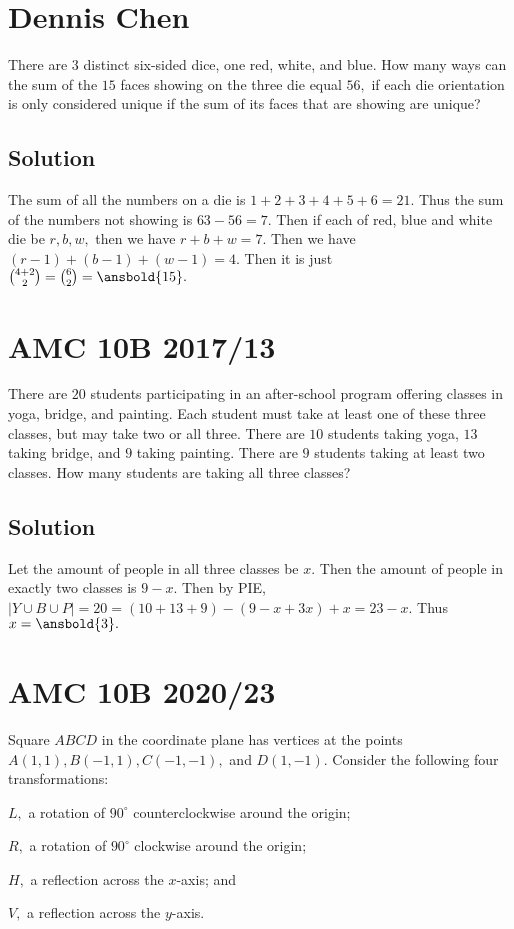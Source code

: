 \documentclass{article}
\begin{document}
\pagebreak\section{Dennis Chen}
There are $3$ distinct six-sided dice, one red, white, and blue. How many ways can the sum of the $15$ faces showing on the three die equal $56,$ if each die orientation is only considered unique if the sum of its faces that are showing are unique?

\subsection{Solution}
The sum of all the numbers on a die is $1+2+3+4+5+6=21.$ Thus the sum of the numbers not showing is $63-56=7.$ Then if each of red, blue and white die be $r, b, w,$ then we have $r+b+w=7.$ Then we have $(r-1)+(b-1)+(w-1)=4$. Then it is just $\binom{4+2}{2} = \binom{6}{2} = \ansbold{15}.$  

\pagebreak\section{AMC 10B 2017/13}
There are $20$ students participating in an after-school program offering classes in yoga, bridge, and painting. Each student must take at least one of these three classes, but may take two or all three. There are $10$ students taking yoga, $13$ taking bridge, and $9$ taking painting. There are $9$ students taking at least two classes. How many students are taking all three classes?

\subsection{Solution}
Let the amount of people in all three classes be $x.$ Then the amount of people in exactly two classes is $9-x.$ Then by PIE, $|Y\cup B\cup P|=20=(10+13+9)-(9-x+3x)+x=23-x.$ Thus $x=\ansbold{3}.$

\pagebreak\section{AMC 10B 2020/23}
Square $ABCD$ in the coordinate plane has vertices at the points $A(1,1), B(-1,1), C(-1,-1),$ and $D(1,-1).$ Consider the following four transformations:
    
\begin{itemize}
    \Item $L,$ a rotation of $90^{\circ}$ counterclockwise around the origin;

    \Item $R,$ a rotation of $90^{\circ}$ clockwise around the origin;
    
    \Item $H,$ a reflection across the $x$-axis; and

    \Item $V,$ a reflection across the $y$-axis.
\end{itemize}
\end{document}
